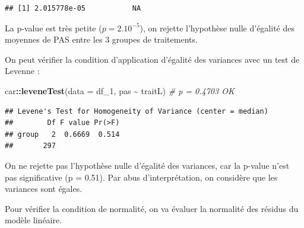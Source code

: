 \documentclass[
]{book}
\newenvironment{Shaded}{\begin{snugshade}}{\end{snugshade}}
\newcommand{\AttributeTok}[1]{\textcolor[rgb]{0.13,0.29,0.53}{#1}}
\newcommand{\CommentTok}[1]{\textcolor[rgb]{0.56,0.35,0.01}{\textit{#1}}}
\newcommand{\DocumentationTok}[1]{\textcolor[rgb]{0.56,0.35,0.01}{\textbf{\textit{#1}}}}
\newcommand{\FunctionTok}[1]{\textcolor[rgb]{0.13,0.29,0.53}{\textbf{#1}}}
\newcommand{\NormalTok}[1]{#1}
\newcommand{\SpecialCharTok}[1]{\textcolor[rgb]{0.81,0.36,0.00}{\textbf{#1}}}
\newcommand{\StringTok}[1]{\textcolor[rgb]{0.31,0.60,0.02}{#1}}
\begin{document}
\begin{Shaded}
\end{Shaded}

\begin{verbatim}
## [1] 2.015778e-05           NA
\end{verbatim}

La p-value est très petite (\(p = 2.10^{-5}\)), on rejette l'hypothèse nulle d'égalité des moyennes de PAS entre les 3 groupes de traitements.

On peut vérifier la condition d'application d'égalité des variances avec un test de Levenne :

\begin{Shaded}
\begin{Highlighting}[]
\NormalTok{car}\SpecialCharTok{::}\FunctionTok{leveneTest}\NormalTok{(}\AttributeTok{data =}\NormalTok{ df\_1, pas }\SpecialCharTok{\textasciitilde{}}\NormalTok{ traitL) }\CommentTok{\# p = 0.4703   OK}
\end{Highlighting}
\end{Shaded}

\begin{verbatim}
## Levene's Test for Homogeneity of Variance (center = median)
##        Df F value Pr(>F)
## group   2  0.6669  0.514
##       297
\end{verbatim}

On ne rejette pas l'hypothèse nulle d'égalité des variances, car la p-value n'est pas significative (p = 0.51). Par abus d'interprétation, on considère que les variances sont égales.

Pour vérifier la condition de normalité, on va évaluer la normalité des résidus du modèle linéaire.
\end{document}
